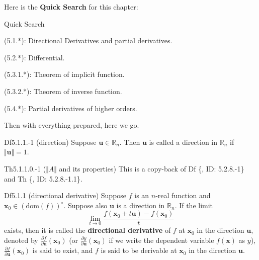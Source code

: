 \documentclass{article}
\newcommand{\parfrac}[2]{\frac{\partial #1}{\partial #2}}
\begin{document}
Here is the \textbf{Quick Search} for this chapter:
\begin{Th}{Quick Search}
    \begin{compactdesc}
        \item (5.1.*): Directional Derivatives and partial derivatives.
        \item (5.2.*): Differential.
        \item (5.3.1.*): Theorem of implicit function.
        \item (5.3.2.*): Theorem of inverse function.
        \item (5.4.*): Partial derivatives of higher orders.
    \end{compactdesc}
\end{Th}

Then with everything prepared, here we go.

\begin{Df}{Df5.1.1.-1 (direction)}
    Suppose $\pmb{u}\in\mathbb{R}_n$. Then $\pmb{u}$ is called a direction in $\mathbb{R}_n$ if $\Vert \pmb{u}\Vert = 1$.
\end{Df}

\begin{Th}{Th5.1.1.0.-1 ($\Vert A\Vert$ and its properties)}
    This is a copy-back of Df \{, ID: 5.2.8.-1\} and Th \{, ID: 5.2.8.-1.1\}.
\end{Th}

\begin{Df}{Df5.1.1 (directional derivative)}
    Suppose $f$ is an $n$-real function and $\pmb{x}_0\in (\text{dom}(f))^\circ$. Suppose also $\pmb{u}$ is a direction in $\mathbb{R}_n$. If the limit
    $$\lim_{t\to 0}\frac{f(\pmb{x}_0 + t\pmb{u}) - f(\pmb{x}_0)}{t}$$ 
    exists, then it is called the \textbf{directional derivative} of $f$ at $\pmb{x}_0$ in the direction $\pmb{u}$, denoted by $\parfrac{f}{\pmb{u}}(\pmb{x}_0)$ (or $\parfrac{y}{\pmb{u}}(\pmb{x}_0)$ if we write the dependent variable $f(\pmb{x})$ as $y$), $\parfrac{f}{\pmb{u}}(\pmb{x}_0)$ is said to exist, and $f$ is said to be derivable at $\pmb{x}_0$ in the direction $\pmb{u}$.
\end{Df}
\end{document}
